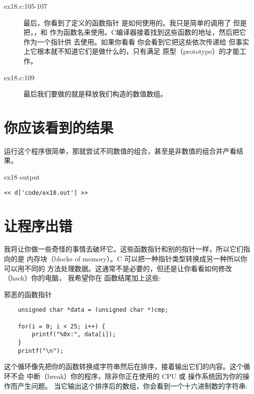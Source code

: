 \begin{description}
\item[ex18.c:105-107] 最后，你看到了定义的函数指针 是如何使用的。我只是简单的调用了  但是把，，和
    作为函数名来使用。C编译器接着找到这些函数的地址，然后把它作为一个指针供  去使用。如果你看看 你会看到它把这些依次传递给 但事实上它根本就不知道它们是做什么的，只有满足 原型（prototype）的才能工作。
\item[ex18.c:109] 最后我们要做的就是释放我们构造的数值数组。
\end{description}


\section{你应该看到的结果}

运行这个程序很简单，那就尝试不同数值的组合，甚至是非数值的组合并产看结果。

\begin{code}{ex18 output}
\begin{lstlisting}
<< d['code/ex18.out'] >>
\end{lstlisting}
\end{code}


\section{让程序出错}

我将让你做一些奇怪的事情去破坏它。这些函数指针和别的指针一样，所以它们指向的是
内存块（blocks of memory）。C 可以把一种指针类型转换成另一种所以你可以用不同的
方法处理数据。这通常不是必要的，但还是让你看看如何修改（hack）你的电脑，
我希望你在  函数结尾加上这些:

\begin{code}{邪恶的函数指针}
\begin{lstlisting}
    unsigned char *data = (unsigned char *)cmp;

    for(i = 0; i < 25; i++) {
        printf("%0x:", data[i]);
    }
    printf("\n");
\end{lstlisting}
\end{code}

这个循环像先把你的函数转换成字符串然后在排序，接着输出它们的内容。这个循环不会
中断（break）你的程序，除非你正在使用的 CPU 或 操作系统因为你的操作而产生问题。
当它输出这个排序后的数组，你会看到一个十六进制数的字符串:

